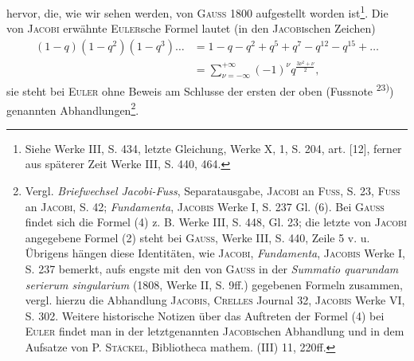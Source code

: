 hervor, die, wie wir sehen werden, von \textsc{Gauss} 1800 aufgestellt worden ist\footnote{Siehe Werke III, S. 434, letzte Gleichung, Werke X, 1, S. 204, art. [12], ferner aus späterer Zeit Werke III, S. 440, 464.}.
Die von \textsc{Jacobi} erwähnte \textsc{Euler}sche Formel lautet (in den \textsc{Jacobi}schen Zeichen)
\begingroup\makeatletter\tagsleft@true\let\veqno\leqno\makeatother
\begin{equation*}\tag*{(4)}
\begin{aligned}
(1-q)(1-q^2)(1-q^3)\ldots&=1-q-q^2+q^5+q^7-q^{12}-q^{15}+\ldots\\
&=\sum_{\nu=-\infty}^{+\infty}(-1)^\nu q^{\frac{3\nu^2+\nu}{2}},
\end{aligned}
\end{equation*}\endgroup
\clearpage{}
\noindent sie steht bei \textsc{Euler} ohne Beweis am Schlusse der ersten der oben (Fussnote \textsuperscript{23)})
genannten Abhandlungen\footnote{Vergl. \textit{Briefwechsel Jacobi-Fuss}, Separatausgabe, \textsc{Jacobi} an \textsc{Fuss}, S. 23, \textsc{Fuss} an \textsc{Jacobi}, S. 42; \textit{Fundamenta}, \textsc{Jacobis} Werke I, S. 237 Gl. (6). Bei \textsc{Gauss} findet sich die Formel (4) z. B. Werke III, S. 448, Gl. 23; die letzte von \textsc{Jacobi} angegebene Formel (2) steht bei \textsc{Gauss}, Werke III, S. 440, Zeile 5 v. u. Übrigens hängen diese Identitäten, wie \textsc{Jacobi}, \textit{Fundamenta}, \textsc{Jacobis} Werke I, S. 237 bemerkt, aufs engste mit den von \textsc{Gauss} in der \textit{Summatio quarundam serierum singularium} (1808, Werke II, S. 9ff.) gegebenen Formeln zusammen, vergl. hierzu die Abhandlung \textsc{Jacobis}, \textsc{Crelles} Journal 32, \textsc{Jacobis} Werke VI, S. 302. Weitere historische Notizen über das Auftreten der Formel (4) bei \textsc{Euler} findet man in der letztgenannten \textsc{Jacobi}schen Abhandlung und in dem Aufsatze von P. \textsc{Stäckel}, Bibliotheca mathem. (III) 11, 220ff.}.

